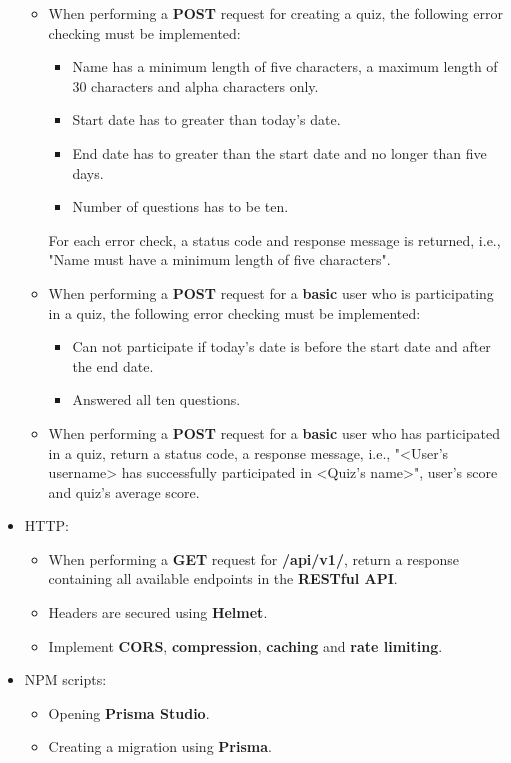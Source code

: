 \documentclass{article}
\begin{document}
\begin{itemize}
\begin{itemize}
		\item When performing a \textbf{POST} request for creating a quiz, the following error checking must be implemented:
		\begin{itemize}
			\item Name has a minimum length of five characters, a maximum length of 30 characters and alpha characters only.
			\item Start date has to greater than today's date.
			\item End date has to greater than the start date and no longer than five days. 
			\item Number of questions has to be ten.
		\end{itemize}
		For each error check, a status code and response message is returned, i.e., "Name must have a minimum length of five characters".
		\item When performing a \textbf{POST} request for a \textbf{basic} user who is participating in a quiz, the following error checking must be implemented:
		\begin{itemize}
			\item Can not participate if today's date is before the start date and after the end date.
			\item Answered all ten questions.
		\end{itemize}
		\item When performing a \textbf{POST} request for a \textbf{basic} user who has participated in a quiz, return a status code, a response message, i.e., "<User's username> has successfully participated in <Quiz's name>", user's score and quiz's average score.
	\end{itemize}
	\item HTTP:
	\begin{itemize}
		\item When performing a \textbf{GET} request for \textbf{/api/v1/}, return a response containing all available endpoints in the \textbf{RESTful API}. 
		\item Headers are secured using \textbf{Helmet}.
		\item Implement \textbf{CORS}, \textbf{compression}, \textbf{caching} and \textbf{rate limiting}.
	\end{itemize}
	\item NPM scripts:
	\begin{itemize}
		\item Opening \textbf{Prisma Studio}.
		\item Creating a migration using \textbf{Prisma}. 

\end{itemize}
\end{itemize}
\end{document}
